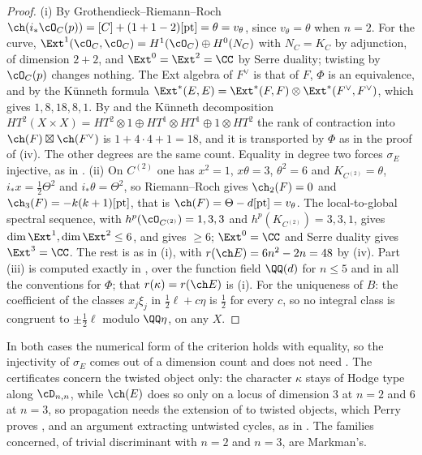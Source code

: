 \begin{proof}
(i) By Grothendieck--Riemann--Roch $\ch(i_{*}\cO_{C}(p))=[C]+(1+1-2)[\mathrm{pt}]
=\theta=v_{\theta}$, since $v_{\theta}=\theta$ when $n=2$. For the curve,
$\Ext^{1}(\cO_{C},\cO_{C})=H^{1}(\cO_{C})\oplus H^{0}(N_{C})$ with
$N_{C}=K_{C}$ by adjunction, of dimension $2+2$, and $\Ext^{0}=\Ext^{2}=\CC$ by
Serre duality; twisting by $\cO_{C}(p)$ changes nothing. The Ext algebra of
$F^{\vee}$ is that of $F$, $\Phi$ is an equivalence, and by the K\"unneth
formula $\Ext^{*}(E,E)=\Ext^{*}(F,F)\otimes\Ext^{*}(F^{\vee},F^{\vee})$, which
gives $1,8,18,8,1$. By  and the K\"unneth
decomposition $HT^{2}(X\times X)=HT^{2}\otimes1\oplus HT^{1}\otimes HT^{1}\oplus
1\otimes HT^{2}$ the rank of contraction into $\ch(F)\boxtimes\ch(F^{\vee})$ is
$1+4\cdot4+1=18$, and it is transported by $\Phi$ as in the proof of
(iv). The other degrees are the same count. Equality in
degree two forces $\sigma_{E}$ injective, as in .
(ii) On $C^{(2)}$ one has $x^{2}=1$, $x\theta=3$, $\theta^{2}=6$ and
$K_{C^{(2)}}=\theta$, $i_{*}x=\frac12\Theta^{2}$ and $i_{*}\theta=\Theta^{2}$, so
Riemann--Roch gives $\ch_{2}(F)=0$ and $\ch_{3}(F)=-k(k+1)[\mathrm{pt}]$, that
is $\ch(F)=\Theta-d[\mathrm{pt}]=v_{\theta}$. The local-to-global spectral
sequence, with $h^{p}(\cO_{C^{(2)}})=1,3,3$ and $h^{p}(K_{C^{(2)}})=3,3,1$,
gives $\dim\Ext^{1},\dim\Ext^{2}\le6$, and  gives
$\ge6$; $\Ext^{0}=\CC$ and Serre duality gives $\Ext^{3}=\CC$. The rest is as
in (i), with $r(\ch E)=6n^{2}-2n=48$ by (iv). Part (iii) is
computed exactly in \cite{BMB26}, over the function field $\QQ(d)$ for $n\le5$
and in all the conventions for $\Phi$; that $r(\kappa)=r(\ch E)$ is
(i). For the uniqueness of $B$: the coefficient of the
classes $x_{j}\xi_{j}$ in $\frac12\ell+c\eta$ is $\frac12$ for every $c$, so no
integral class is congruent to $\pm\frac12\ell$ modulo $\QQ\eta$, on any $X$.
\end{proof}

In both cases the numerical form of the criterion holds with equality, so the
injectivity of $\sigma_{E}$ comes out of a dimension count and does not need
\cite[Question 11.4]{Mar25b}. The certificates concern the twisted object
only: the character $\kappa$ stays of Hodge type along $\cD_{n,n}$, while
$\ch(E)$ does
so only on a locus of dimension $3$ at $n=2$ and $6$ at $n=3$, so propagation
needs the extension of  to twisted objects, which Perry proves
\cite{Per26}, and an argument extracting untwisted cycles, as in
\cite[Section 2]{Mar25b}. The families concerned, of trivial discriminant with
$n=2$ and $n=3$, are Markman's.

